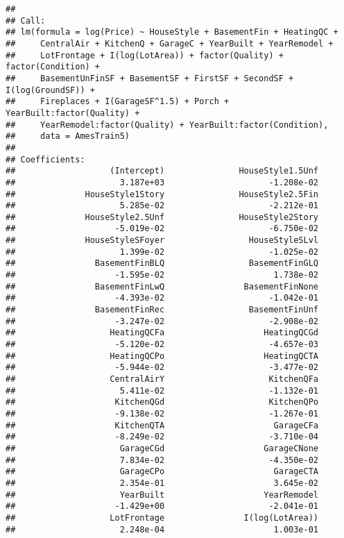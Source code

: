 \documentclass[
]{article}
\begin{document}
\begin{verbatim}
## 
## Call:
## lm(formula = log(Price) ~ HouseStyle + BasementFin + HeatingQC + 
##     CentralAir + KitchenQ + GarageC + YearBuilt + YearRemodel + 
##     LotFrontage + I(log(LotArea)) + factor(Quality) + factor(Condition) + 
##     BasementUnFinSF + BasementSF + FirstSF + SecondSF + I(log(GroundSF)) + 
##     Fireplaces + I(GarageSF^1.5) + Porch + YearBuilt:factor(Quality) + 
##     YearRemodel:factor(Quality) + YearBuilt:factor(Condition), 
##     data = AmesTrain5)
## 
## Coefficients:
##                   (Intercept)               HouseStyle1.5Unf  
##                     3.187e+03                     -1.208e-02  
##              HouseStyle1Story               HouseStyle2.5Fin  
##                     5.285e-02                     -2.212e-01  
##              HouseStyle2.5Unf               HouseStyle2Story  
##                    -5.019e-02                     -6.750e-02  
##              HouseStyleSFoyer                 HouseStyleSLvl  
##                     1.399e-02                     -1.025e-02  
##                BasementFinBLQ                 BasementFinGLQ  
##                    -1.595e-02                      1.738e-02  
##                BasementFinLwQ                BasementFinNone  
##                    -4.393e-02                     -1.042e-01  
##                BasementFinRec                 BasementFinUnf  
##                    -3.247e-02                     -2.908e-02  
##                   HeatingQCFa                    HeatingQCGd  
##                    -5.120e-02                     -4.657e-03  
##                   HeatingQCPo                    HeatingQCTA  
##                    -5.944e-02                     -3.477e-02  
##                   CentralAirY                     KitchenQFa  
##                     5.411e-02                     -1.132e-01  
##                    KitchenQGd                     KitchenQPo  
##                    -9.138e-02                     -1.267e-01  
##                    KitchenQTA                      GarageCFa  
##                    -8.249e-02                     -3.710e-04  
##                     GarageCGd                    GarageCNone  
##                     7.834e-02                     -4.350e-02  
##                     GarageCPo                      GarageCTA  
##                     2.354e-01                      3.645e-02  
##                     YearBuilt                    YearRemodel  
##                    -1.429e+00                     -2.041e-01  
##                   LotFrontage                I(log(LotArea))  
##                     2.248e-04                      1.003e-01  

\end{verbatim}
\end{document}
